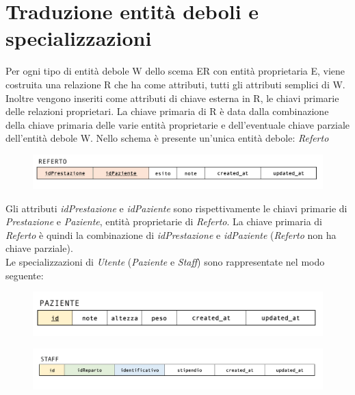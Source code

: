 \documentclass[paper=a4, fontsize=11pt,x11names]{report}
\begin{document}
\section{Traduzione entità deboli e specializzazioni}
Per ogni tipo di entità debole W dello scema ER con entità proprietaria E, viene costruita una relazione R che ha come attributi, tutti gli attributi semplici di W. Inoltre vengono inseriti come attributi di chiave esterna in R, le chiavi primarie delle relazioni proprietari. La chiave primaria di R è data dalla combinazione della chiave primaria delle varie entità proprietarie e dell'eventuale chiave parziale dell'entità debole W.
Nello schema è presente un'unica entità debole: \textit{Referto}
\begin{figure}[H]
\begin{center}
\includegraphics[scale=0.3]{refertoSchema}
\end{center}
\end{figure}
Gli attributi \textit{idPrestazione} e \textit{idPaziente} sono rispettivamente le chiavi primarie di \textit{Prestazione} e \textit{Paziente}, entità proprietarie di \textit{Referto}. La chiave primaria di \textit{Referto} è quindi la combinazione di \textit{idPrestazione} e \textit{idPaziente} (\textit{Referto} non ha chiave parziale).\\

Le specializzazioni di \textit{Utente} (\textit{Paziente} e \textit{Staff}) sono rappresentate nel modo seguente:
\begin{figure}[H]
\begin{center}
\includegraphics[scale=0.3]{pazienteSchema}
\end{center}
\end{figure}

\begin{figure}[H]
\begin{center}
\includegraphics[scale=0.25]{staffSchema}
\end{center}
\end{figure}
\end{document}
